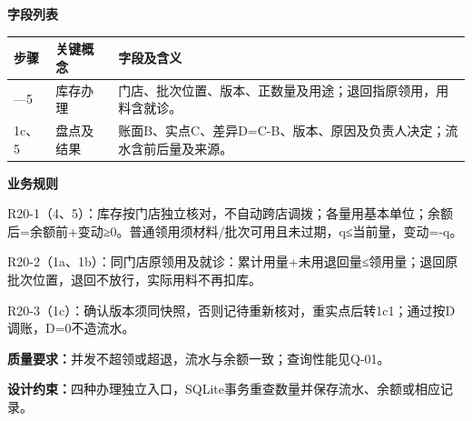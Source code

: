 \documentclass[UTF8,a4paper,zihao=-4,fontset=none]{ctexart}
\begin{document}
\noindent\textbf{字段列表}\par
{\setlength{\tabcolsep}{3pt}\renewcommand{\arraystretch}{1.04}
\noindent\begin{tabular}{@{}>{\raggedright\arraybackslash}p{1.2cm}>{\raggedright\arraybackslash}p{2.2cm}>{\raggedright\arraybackslash}p{12.3cm}@{}}
\toprule
步骤 & 关键概念 & 字段及含义 \\ \midrule
1—5 & 库存办理 & 门店、批次位置、版本、正数量及用途；退回指原领用，用料含就诊。 \\
1c、5 & 盘点及结果 & 账面B、实点C、差异D=C-B、版本、原因及负责人决定；流水含前后量及来源。 \\
\bottomrule
\end{tabular}\par}
\smallskip
\noindent\textbf{业务规则}\par
\noindent R20-1（4、5）：库存按门店独立核对，不自动跨店调拨；各量用基本单位；余额后=余额前+变动≥0。普通领用须材料/批次可用且未过期，q≤当前量，变动=-q。\par
\noindent R20-2（1a、1b）：同门店原领用及就诊：累计用量+未用退回量≤领用量；退回原批次位置，退回不放行，实际用料不再扣库。\par
\noindent R20-3（1c）：确认版本须同快照，否则记待重新核对，重实点后转1c1；通过按D调账，D=0不造流水。\par
\smallskip
\noindent\textbf{质量要求：}并发不超领或超退，流水与余额一致；查询性能见Q-01。\par
\noindent\textbf{设计约束：}四种办理独立入口，SQLite事务重查数量并保存流水、余额或相应记录。\par
\endgroup
\clearpage
\end{document}
